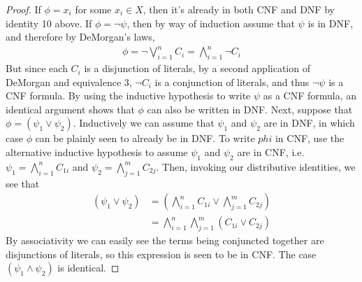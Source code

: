 \begin{proof}
If $\phi = x_i$ for some $x_i \in X$, then it's already in both CNF and DNF by identity 10 above. If $\phi = \neg \psi$, then by way of induction assume that $\psi$ is in DNF, and therefore by DeMorgan's laws,
\begin{align}
    \phi = \neg \bigvee_{i=1}^{n} C_i = \bigwedge_{i=1}^n \neg C_i
\end{align}
But since each $C_i$ is a disjunction of literals, by a second application of DeMorgan and equivalence 3, $\neg C_i$ is a conjunction of literals, and thus $\neg \psi$ is a CNF formula. By using the inductive hypothesis to write $\psi$ as a CNF formula, an identical argument shows that $\phi$ can also be written in DNF. Next, suppose that $\phi = (\psi_1 \vee \psi_2)$. Inductively we can assume that $\psi_1$ and $\psi_2$ are in DNF, in which case $\phi$ can be plainly seen to already be in DNF. To write $phi$ in CNF, use the alternative inductive hypothesis to assume $\psi_1$ and $\psi_2$ are in CNF, i.e. $\psi_1 = \bigwedge_{i=1}^{n} C_{1i}$ and $\psi_2 = \bigwedge_{j=1}^{m} C_{2j}$. Then, invoking our distributive identities, we see that
\begin{align}
    (\psi_1 \vee \psi_2) &= (\bigwedge_{i=1}^{n} C_{1i} \vee \bigwedge_{j=1}^{m} C_{2j}) \\
                        &= \bigwedge_{i=1}^{n} \bigwedge_{j=1}^{m} (C_{1i} \vee C_{2j}) 
\end{align}
By associativity we can easily see the terms being conjuncted together are disjunctions of literals, so this expression is seen to be in CNF. The case $(\psi_1 \wedge \psi_2)$ is identical. 
\end{proof}

